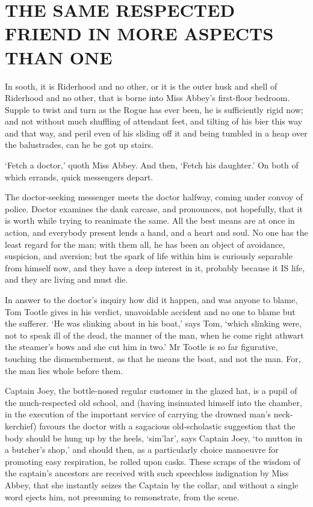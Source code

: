 
\chapter{THE SAME RESPECTED FRIEND IN MORE ASPECTS THAN ONE}

In sooth, it is Riderhood and no other, or it is the outer husk and
shell of Riderhood and no other, that is borne into Miss Abbey’s
first-floor bedroom. Supple to twist and turn as the Rogue has ever
been, he is sufficiently rigid now; and not without much shuffling of
attendant feet, and tilting of his bier this way and that way, and
peril even of his sliding off it and being tumbled in a heap over the
balustrades, can he be got up stairs.

‘Fetch a doctor,’ quoth Miss Abbey. And then, ‘Fetch his daughter.’ On
both of which errands, quick messengers depart.

The doctor-seeking messenger meets the doctor halfway, coming under
convoy of police. Doctor examines the dank carcase, and pronounces, not
hopefully, that it is worth while trying to reanimate the same. All the
best means are at once in action, and everybody present lends a hand,
and a heart and soul. No one has the least regard for the man; with them
all, he has been an object of avoidance, suspicion, and aversion; but
the spark of life within him is curiously separable from himself now,
and they have a deep interest in it, probably because it IS life, and
they are living and must die.

In answer to the doctor’s inquiry how did it happen, and was anyone to
blame, Tom Tootle gives in his verdict, unavoidable accident and no one
to blame but the sufferer. ‘He was slinking about in his boat,’ says
Tom, ‘which slinking were, not to speak ill of the dead, the manner of
the man, when he come right athwart the steamer’s bows and she cut him
in two.’ Mr Tootle is so far figurative, touching the dismemberment, as
that he means the boat, and not the man. For, the man lies whole before
them.

Captain Joey, the bottle-nosed regular customer in the glazed hat, is a
pupil of the much-respected old school, and (having insinuated himself
into the chamber, in the execution of the important service of carrying
the drowned man’s neck-kerchief) favours the doctor with a sagacious
old-scholastic suggestion that the body should be hung up by the heels,
‘sim’lar’, says Captain Joey, ‘to mutton in a butcher’s shop,’ and
should then, as a particularly choice manoeuvre for promoting easy
respiration, be rolled upon casks. These scraps of the wisdom of the
captain’s ancestors are received with such speechless indignation by
Miss Abbey, that she instantly seizes the Captain by the collar, and
without a single word ejects him, not presuming to remonstrate, from the
scene.


